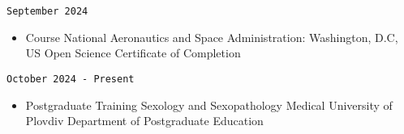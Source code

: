 \documentclass[
  12pt,
  letterpaper,
  DIV=11,
  numbers=noendperiod]{scrartcl}
\providecommand{\tightlist}{%
  \setlength{\itemsep}{0pt}\setlength{\parskip}{0pt}}\usepackage{longtable,booktabs,array}
\begin{document}
\texttt{September\ 2024}

\begin{itemize}
\tightlist
\item
  Course \textbar{} National Aeronautics and Space Administration:
  Washington, D.C, US \textbar{} Open Science \textbar{} Certificate of
  Completion
\end{itemize}

\texttt{October\ 2024\ -\ Present}

\begin{itemize}
\tightlist
\item
  Postgraduate Training \textbar{} Sexology and Sexopathology \textbar{}
  Medical University of Plovdiv \textbar{} Department of Postgraduate
  Education
\end{itemize}
\end{document}
